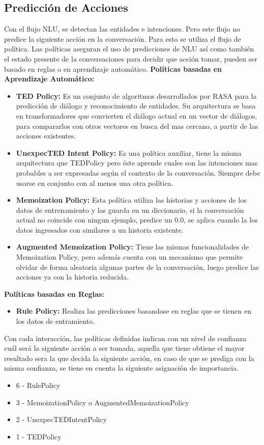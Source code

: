  \subsection{Predicción de Acciones}
Con el flujo NLU, se detectan las entidades e intenciones. Pero este flujo no predice la siguiente acción en la 
conversación. Para esto se utiliza el flujo de política. Las políticas aseguran el uso de predicciones de NLU así como 
también el estado presente de la conversaciones para decidir que acción tomar, pueden ser basado en reglas o en aprendizaje automático.
\textbf{Políticas basadas en Aprendizaje Automático:}
\begin{itemize}
    \item \textbf{TED Policy:}
    Es un conjunto de algoritmos desarrollados por RASA para la predicción de diálogo y reconocimiento de entidades. Su arquitectura se basa en transformadores que convierten el diálogo actual en un vector de diálogos, para compararlos con otros vectores en busca del mas cercano, a partir de las acciones existentes.\cite{TED_Policy}
    \item \textbf{UnexpecTED Intent Policy:} Es una política auxiliar, tiene la misma arquitectura que TEDPolicy pero éste aprende cuales son las intenciones mas probables a ser expresadas según el contexto de la conversación. Siempre debe usarse en conjunto con al menos una otra política.\cite{UnexpecTED}
    \item \textbf{Memoization Policy: }Esta política utiliza las historias y acciones de los datos de entrenamiento y las guarda en un diccionario, si la conversación actual no coincide con ningun ejemplo, predice un 0.0, se aplica cuando la los datos ingresados con similares a un historia existente.\cite{MemoizationPolicy}
    \item \textbf{Augmented Memoization Policy: } Tiene las mismas funcionalidades de Memoization Policy, pero además cuenta con un mecanismo que permite olvidar de forma aleatoria algunas partes de la conversación, luego predice las acciones ya con la historia reducida.\cite{AugmentedMemoizationPolicy}
\end{itemize}
\textbf{Políticas basadas en Reglas:}
\begin{itemize}
    \item \textbf{Rule Policy:} Realiza las predicciones basandose en reglas que se tienen en los datos de entramiento.
\end{itemize}
\indent Con cada interacción, las políticas definidas indican con un nivel de confianza cuál será la siguiente acción a ser tomada, aquella que tiene obtiene el mayor resultado sera la que decida la siguiente acción, en caso de que se prediga con la misma confianza, se tiene en cuenta la siguiente asignación de importancia.
\begin{itemize}
    \item 6 - RulePolicy
    \item 3 - MemoizationPolicy o AugmentedMemoizationPolicy
    \item 2 -  UnexpecTEDIntentPolicy
    \item 1 - TEDPolicy
\end{itemize}
